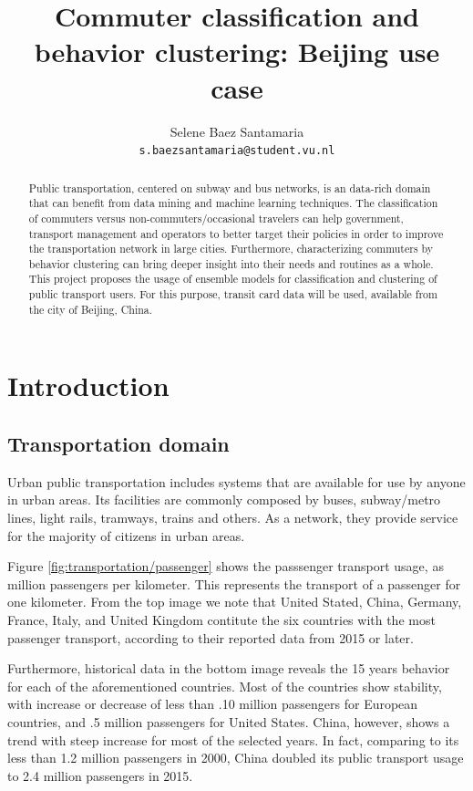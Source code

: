 \documentclass{article}
\title{Commuter classification and behavior clustering: Beijing use case}
\author{
  Selene Baez  Santamaria \\
  \texttt{s.baezsantamaria@student.vu.nl}
}
\begin{document}

\maketitle

\begin{abstract}
  Public transportation, centered on subway and bus networks, is an data-rich domain that can benefit from data mining and machine learning techniques. The classification of commuters versus non-commuters/occasional travelers can help government, transport management and operators to better target their policies in order to improve the transportation network in large cities. Furthermore, characterizing commuters by behavior clustering can bring deeper insight into their needs and routines as a whole. 
  This project proposes the usage of ensemble models for classification and clustering of public transport users. For this purpose, transit card data will be used, available from the city of Beijing, China. 
\end{abstract}

\newpage

\tableofcontents

\newpage
\section{Introduction}

\subsection{Transportation domain}
Urban public transportation includes systems that are available for use by anyone in urban areas. Its facilities are commonly composed by buses, subway/metro lines, light rails, tramways, trains and others. As a network, they provide service for the majority of citizens in urban areas.\citep{vuchic1900urban}

Figure \ref{fig:transportation/passenger} shows the passsenger transport usage, as million passengers per kilometer. This represents the transport of a passenger for one kilometer. From the top image we note that United Stated, China, Germany, France, Italy, and United Kingdom contitute the six countries with the most passenger transport, according to their reported data from 2015 or later.\cite{OECD2017passenger} 

Furthermore, historical data in the bottom image reveals the 15 years behavior for each of the aforementioned countries. Most of the countries show stability, with increase or decrease of less than .10 million passengers for European countries, and .5 million passengers for United States. China, however, shows a trend with steep increase for most of the selected years. In fact, comparing to its less than 1.2 million passengers in 2000, China doubled its public transport usage to 2.4 million passengers in 2015. 
\end{document}
